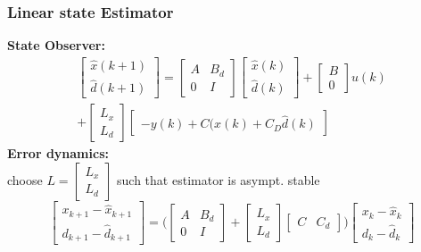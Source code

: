 \subsubsection{Linear state Estimator}
\textbf{State Observer:}
\begin{gather*}
    \begin{bmatrix}
        \hat{x}(k+1)\\
        \hat{d}(k+1)
    \end{bmatrix} =
    \begin{bmatrix}
        A & B_d \\
        0 & I
    \end{bmatrix} 
    \begin{bmatrix}
        \hat{x}(k)\\
        \hat{d}(k)
    \end{bmatrix} +
    \begin{bmatrix}
    B \\ 0
    \end{bmatrix} u(k) \\
    + \begin{bmatrix}
    L_x\\
    L_d
    \end{bmatrix}\begin{bmatrix}
    -y(k)+C(\hat{x}(k)+C_D\hat{d}(k)
    \end{bmatrix}
\end{gather*}
\textbf{Error dynamics:}\\
choose $L= \begin{bmatrix}
L_x \\ L_d
\end{bmatrix}$ such that estimator is asympt. stable
\[\begin{bmatrix}
x_{k+1}- \hat{x}_{k+1} \\
d_{k+1} - \hat{d}_{k+1} \end{bmatrix} = {\Bigg(}\begin{bmatrix}
A & B_d\\ 0 & I 
\end{bmatrix} + \begin{bmatrix}
L_x \\ L_d
\end{bmatrix} \begin{bmatrix}
C & C_d
\end{bmatrix}{\Bigg)} \begin{bmatrix}
x_k-\hat{x}_k \\ d_k- \hat{d}_k
\end{bmatrix}\]
